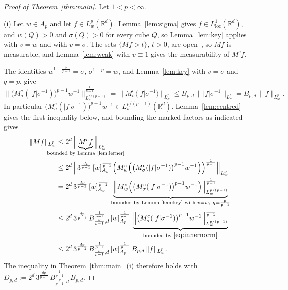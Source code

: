 \documentclass[12pt]{article}
\begin{document}
\begin{proof}[Proof of Theorem~\ref{thm:main}]
Let $1 < p < \infty$.

(i) Let $w \in A_p$ and let $f \in L^p_w(\mathbb{R}^d)$. Lemma~\ref{lem:sigma} gives $f \in L^1_{\mathrm{loc}}(\mathbb{R}^d)$, and $w(Q) > 0$ and $\sigma(Q) > 0$ for every cube $Q$, so Lemma~\ref{lem:key} applies with $v = w$ and with $v = \sigma$. The sets $\{Mf > t\}$, $t > 0$, are open~\cite[Section~2.1.1]{GrafakosClassical}, so $Mf$ is measurable, and Lemma~\ref{lem:weak} with $v \equiv 1$ gives the measurability of $M^c f$.

The identities $w^{1 - \frac{p}{p-1}} = \sigma$, $\sigma^{1-p} = w$, and Lemma~\ref{lem:key} with $v = \sigma$ and $q = p$, give
\begin{equation}\label{eq:innernorm}
  \Big\| \big(M^c_\sigma(|f|\sigma^{-1})\big)^{p-1} w^{-1} \Big\|_{L^{p/(p-1)}_w}^{\frac{1}{p-1}} = \big\| M^c_\sigma\big(|f|\sigma^{-1}\big) \big\|_{L^p_\sigma} \le B_{p,d}\, \big\| |f|\sigma^{-1} \big\|_{L^p_\sigma} = B_{p,d}\, \|f\|_{L^p_w} .
\end{equation}
In particular $\big(M^c_\sigma(|f|\sigma^{-1})\big)^{p-1} w^{-1} \in L^{p/(p-1)}_w(\mathbb{R}^d)$. Lemma~\ref{lem:centred} gives the first inequality below, and bounding the marked factors as indicated gives
\begin{align*}
  \|Mf\|_{L^p_w}
  &\le 2^d\, \Big\| \underbrace{M^c f}_{\mathclap{\text{bounded by Lemma~\ref{lem:lerner}}}} \Big\|_{L^p_w} \\
  &\le 2^d\, \Big\| 3^{\frac{dp}{p-1}}\, [w]_{A_p}^{\frac{1}{p-1}} \Big( M^c_w\Big( \big(M^c_\sigma(|f|\sigma^{-1})\big)^{p-1} w^{-1} \Big) \Big)^{\frac{1}{p-1}} \Big\|_{L^p_w} \\
  &= 2^d\, 3^{\frac{dp}{p-1}}\, [w]_{A_p}^{\frac{1}{p-1}}\, \underbrace{\Big\| M^c_w\Big( \big(M^c_\sigma(|f|\sigma^{-1})\big)^{p-1} w^{-1} \Big) \Big\|_{L^{p/(p-1)}_w}^{\frac{1}{p-1}}}_{\text{bounded by Lemma~\ref{lem:key} with } v = w,\ q = \frac{p}{p-1}} \\
  &\le 2^d\, 3^{\frac{dp}{p-1}}\, B_{\frac{p}{p-1},d}^{\frac{1}{p-1}}\, [w]_{A_p}^{\frac{1}{p-1}}\, \underbrace{\Big\| \big(M^c_\sigma(|f|\sigma^{-1})\big)^{p-1} w^{-1} \Big\|_{L^{p/(p-1)}_w}^{\frac{1}{p-1}}}_{\text{bounded by } \eqref{eq:innernorm}} \\
  &\le 2^d\, 3^{\frac{dp}{p-1}}\, B_{\frac{p}{p-1},d}^{\frac{1}{p-1}}\, [w]_{A_p}^{\frac{1}{p-1}}\, B_{p,d}\, \|f\|_{L^p_w}.
\end{align*}
The inequality in Theorem~\ref{thm:main}~(i) therefore holds with $D_{p,d} := 2^d\, 3^{\frac{dp}{p-1}}\, B_{\frac{p}{p-1},d}^{\frac{1}{p-1}}\, B_{p,d}$.


\end{proof}
\end{document}
